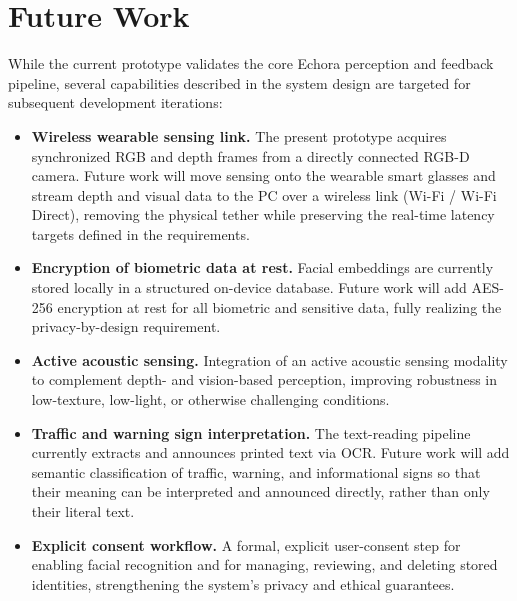 \section{Future Work}

While the current prototype validates the core Echora perception and feedback pipeline, several capabilities described in the system design are targeted for subsequent development iterations:

\begin{itemize}
    \item \textbf{Wireless wearable sensing link.} The present prototype acquires synchronized RGB and depth frames from a directly connected RGB-D camera. Future work will move sensing onto the wearable smart glasses and stream depth and visual data to the PC over a wireless link (Wi-Fi / Wi-Fi Direct), removing the physical tether while preserving the real-time latency targets defined in the requirements.
    \item \textbf{Encryption of biometric data at rest.} Facial embeddings are currently stored locally in a structured on-device database. Future work will add AES-256 encryption at rest for all biometric and sensitive data, fully realizing the privacy-by-design requirement.
    \item \textbf{Active acoustic sensing.} Integration of an active acoustic sensing modality to complement depth- and vision-based perception, improving robustness in low-texture, low-light, or otherwise challenging conditions.
    \item \textbf{Traffic and warning sign interpretation.} The text-reading pipeline currently extracts and announces printed text via OCR. Future work will add semantic classification of traffic, warning, and informational signs so that their meaning can be interpreted and announced directly, rather than only their literal text.
    \item \textbf{Explicit consent workflow.} A formal, explicit user-consent step for enabling facial recognition and for managing, reviewing, and deleting stored identities, strengthening the system's privacy and ethical guarantees.
\end{itemize}